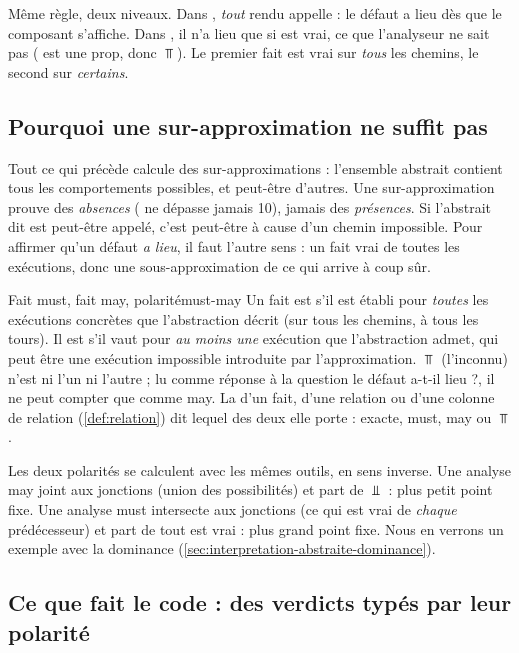 Même règle, deux niveaux. Dans , \emph{tout} rendu
appelle  : le défaut a lieu dès que le composant s'affiche. Dans
, il n'a lieu que si  est vrai, ce que
l'analyseur ne sait pas ( est une prop, donc $\Top$). Le premier
fait est vrai sur \emph{tous} les chemins, le second sur \emph{certains}.

\subsection{Pourquoi une sur-approximation ne suffit pas}

Tout ce qui précède calcule des sur-approximations : l'ensemble abstrait
contient tous les comportements possibles, et peut-être d'autres. Une
sur-approximation prouve des \emph{absences} (\og {} ne dépasse
jamais 10\fg{}), jamais des \emph{présences}. Si l'abstrait dit
\og {} est peut-être appelé\fg{}, c'est peut-être à cause d'un chemin
impossible. Pour affirmer qu'un défaut \emph{a lieu}, il faut l'autre sens :
un fait vrai de toutes les exécutions, donc une sous-approximation de ce qui
arrive à coup sûr.

\begin{definition}{Fait must, fait may, polarité}{must-may}
  Un fait est  s'il est établi pour \emph{toutes} les exécutions
  concrètes que l'abstraction décrit (sur tous les chemins, à tous les tours).
  Il est  s'il vaut pour \emph{au moins une} exécution que
  l'abstraction admet, qui peut être une exécution impossible introduite par
  l'approximation. $\Top$ (l'inconnu) n'est ni l'un ni l'autre ; lu comme
  réponse à la question \og le défaut a-t-il lieu ?\fg{}, il ne peut compter
  que comme may. La  d'un fait, d'une relation ou d'une
  colonne de relation (\cref{def:relation}) dit lequel des deux elle porte :
  exacte, must, may ou $\Top$.
\end{definition}

Les deux polarités se calculent avec les mêmes outils, en sens inverse. Une
analyse may joint aux jonctions (union des possibilités) et part de $\Bot$ :
plus petit point fixe. Une analyse must intersecte aux jonctions (ce qui est
vrai de \emph{chaque} prédécesseur) et part de \og tout est vrai\fg{} : plus
grand point fixe. Nous en verrons un exemple avec la dominance
(\cref{sec:interpretation-abstraite-dominance}).

\subsection{Ce que fait le code : des verdicts typés par leur polarité}

